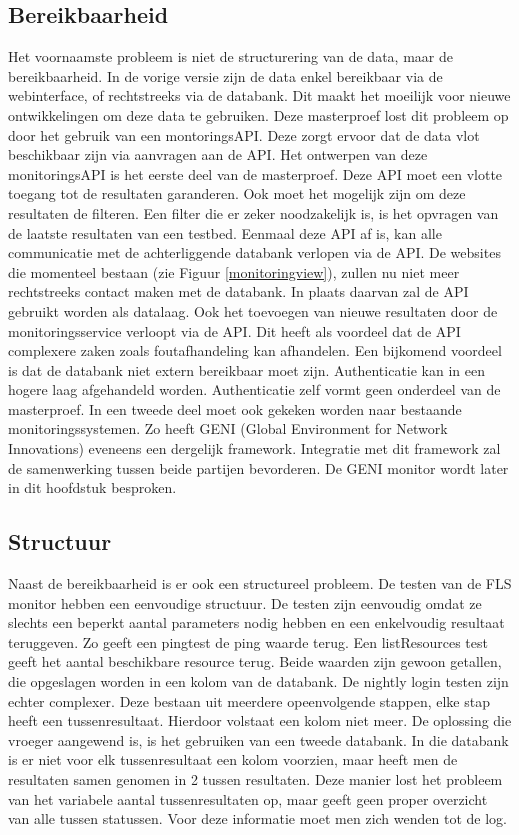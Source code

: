\subsection{Bereikbaarheid}
\npar
Het voornaamste probleem is niet de structurering van de data, maar de bereikbaarheid. In de vorige versie zijn de data enkel bereikbaar via de webinterface, of rechtstreeks via de databank. Dit maakt het moeilijk voor nieuwe ontwikkelingen om deze data te gebruiken. Deze masterproef lost dit probleem op door het gebruik van een montoringsAPI. Deze zorgt ervoor dat de data vlot beschikbaar zijn via aanvragen aan de API.
\npar
Het ontwerpen van deze monitoringsAPI is het eerste deel van de masterproef. Deze API moet een vlotte toegang tot de resultaten garanderen. Ook moet het mogelijk zijn om deze resultaten de filteren. Een filter die er zeker noodzakelijk is, is het opvragen van de laatste resultaten van een testbed. Eenmaal deze API af is, kan alle communicatie met de achterliggende databank verlopen via de API. De websites die momenteel bestaan (zie Figuur \ref{monitoringview}), zullen nu niet meer rechtstreeks contact maken met de databank. In plaats daarvan zal de API gebruikt worden als datalaag.
\npar
Ook het toevoegen van nieuwe resultaten door de monitoringsservice verloopt via de API. Dit heeft als voordeel dat de API complexere zaken zoals foutafhandeling kan afhandelen. Een bijkomend voordeel is dat de databank niet extern bereikbaar moet zijn. Authenticatie kan in een hogere laag afgehandeld worden. Authenticatie zelf vormt geen onderdeel van de masterproef.
\npar
In een tweede deel moet ook gekeken worden naar bestaande monitoringssystemen. Zo heeft GENI (Global Environment for Network Innovations) eveneens een dergelijk framework. Integratie met dit framework zal de samenwerking tussen beide partijen bevorderen. De GENI monitor wordt later in dit hoofdstuk besproken.

\subsection{Structuur}
\npar
Naast de bereikbaarheid is er ook een structureel probleem. De testen van de FLS monitor hebben een eenvoudige structuur. De testen zijn eenvoudig omdat ze slechts een beperkt aantal parameters nodig hebben en een enkelvoudig resultaat teruggeven. Zo geeft een pingtest de ping waarde terug. Een listResources test geeft het aantal beschikbare resource terug. Beide waarden zijn gewoon getallen, die opgeslagen worden in een kolom van de databank.
\clearpage
\npar
De nightly login testen zijn echter complexer. Deze bestaan uit meerdere opeenvolgende stappen, elke stap heeft een tussenresultaat. Hierdoor volstaat een kolom niet meer. De oplossing die vroeger aangewend is, is het gebruiken van een tweede databank. In die databank is er niet voor elk tussenresultaat een kolom voorzien, maar heeft men de resultaten samen genomen in 2 tussen resultaten. Deze manier lost het probleem van het variabele aantal tussenresultaten op, maar geeft geen proper overzicht van alle tussen statussen. Voor deze informatie moet men zich wenden tot de log.
